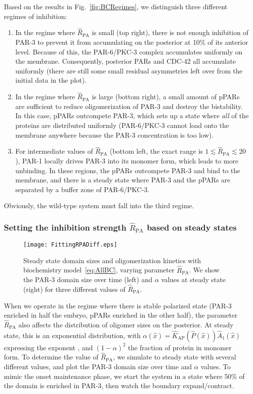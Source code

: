 \documentclass[11pt]{article}
\newcommand{\6}[1]{#1_{\text{6}}}
\newcommand{\3}[1]{#1_{\text{3}}}
\begin{document}
Based on the results in Fig.\ \ref{fig:BCRegimes}, we distinguish three different regimes of inhibition:
\begin{enumerate}
\item In the regime where $\hat R_\text{PA}$ is small (top right), there is not enough inhibition of PAR-3 to prevent it from accumulating on the posterior at 10\% of its anterior level. Because of this, the PAR-6/PKC-3 complex accumulates uniformly on the membrane. Consequently, posterior PARs and CDC-42 all accumulate uniformly (there are still some small residual asymmetries left over from the initial data in the plot). 
\item In the regime where $\hat R_\text{PA}$ is large (bottom right), a small amount of pPARs are sufficient to reduce oligomerization of PAR-3 and destroy the bistability. In this case, pPARs outcompete PAR-3, which sets up a state where \emph{all} of the proteins are distributed uniformly (PAR-6/PKC-3 cannot load onto the membrane anywhere because the PAR-3 concentration is too low). 
\item For intermediate values of $\hat R_\text{PA}$ (bottom left, the exact range is $1 \lesssim \hat R_\text{PA} \lesssim 20$), PAR-1 locally drives PAR-3 into its monomer form, which leads to more unbinding. In these regions, the pPARs outcompete PAR-3 and bind to the membrane, and there is a steady state where PAR-3 and the pPARs are separated by a buffer zone of PAR-6/PKC-3.
\end{enumerate}
Obviously, the wild-type system must fall into the third regime.

\subsubsection{Setting the inhibition strength $\hat R_\text{PA}$ based on steady states}

\begin{figure}
\centering
\texttt{[image: FittingRPADiff.eps]}
\caption{\label{fig:BCSS}Steady state domain sizes and oligomerization kinetics with biochemistry model\ \eqref{eq:AllBC}, varying parameter $\hat R_\text{PA}$. We show the PAR-3 domain size over time (left) and $\alpha$ values at steady state (right) for three different values of $\hat R_\text{PA}$. }
\end{figure}

When we operate in the regime where there is stable polarized state (PAR-3 enriched in half the embryo, pPARs enriched in the other half), the parameter $\hat R_\text{PA}$ also affects the distribution of oligomer sizes on the posterior. At steady state, this is an exponential distribution, with $\alpha(\hat x) = \hat K_\text{AP}\left(\hat P(\hat x) \right) \hat A_1(\hat x) $ expressing the exponent \cite{lang2022oligomerization,lang2023oligomerization}, and $(1-\alpha)^2$ the fraction of protein in monomer form. To determine the value of $\hat R_\text{PA}$, we simulate to steady state with several different values, and plot the PAR-3 domain size over time and $\alpha$ values. To mimic the onset maintenance phase, we start the system in a state where 50\% of the domain is enriched in PAR-3, then watch the boundary expand/contract.
\end{document}
